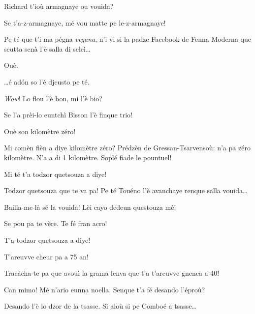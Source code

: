 \begin{drama}

\Saventaspeaks{} Richard t'ioù armagnaye ou vouida?

\Richardspeaks Se t'a-z-armagnaye, mé vou matte pe le-z-armagnaye!


\Saventaspeaks{} Pe té que t'i ma pégna \textit{vegana}, n'i vi si la padze Facebook de Fenna Moderna que seutta senà l'è salla di seleì\ldots

\Gerominespeaks Ouè.

\Saventaspeaks \ldots é ad\'on so l'è djeusto pe té.


\Gerominespeaks \textit{Wow}!  Lo flou l'è bon, mi l'è bio?

\Tuenospeaks Se l'a prèi-lo euntchì Bisson l'è finque trio!

\Saventaspeaks Ouè son kilomètre zéro!

\Richardspeaks Mi comèn fièn a diye kilomètre zéro? Prédzèn de Gressan-Tsarvensoù: n'a pa zéro kilomètre. N'a a di 1 kilomètre. Soplé fiade le pountuel!

\Tuenospeaks{} Mi té t'a todzor quetsouza a diye! 

\Saventaspeaks{} Todzor quetsouza que te va pa! Pe té Touéno l’è avanchaye renque salla vouida\ldots

\Tuenospeaks Bailla-me-là sé la vouida! Lèi cayo dedeun questouza mé!



\Richardspeaks{} Se pou pa te vère. Te fé fran acro!

\Tuenospeaks T'a todzor quetsouza a diye!

\Richardspeaks T'areuvve cheur pa a 75 an!

\Tuenospeaks Tracàcha-te pa que avouì la grama lenva que t'a t'areuvve gnenca a 40!

\scene[-- Si pe Comboé]

\Saventaspeaks Can mimo! Mé n'ario eunna noella.  Senque t'a fé desando l'éproù?

\Tuenospeaks Desando l'è lo dzor de la tsasse. Si aloù si pe Comboé a tsasse\ldots


\end{drama}
